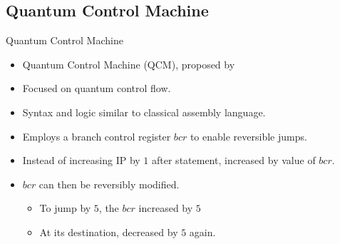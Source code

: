 
\subsection{Quantum Control Machine}
\begin{frame}{Quantum Control Machine}
    \begin{itemize}
        \item Quantum Control Machine (QCM), proposed by \cite{YVC24}
        \item Focused on quantum control flow.
        \item Syntax and logic similar to classical assembly language.
        \item Employs a branch control register $bcr$ to enable reversible jumps.
        \item Instead of increasing IP by $1$ after statement, increased by value of $bcr$.
        \item $bcr$ can then be reversibly modified.
        \begin{itemize}
            \item To jump by $5$, the $bcr$ increased by $5$
            \item At its destination, decreased by $5$ again.
        \end{itemize}
    \end{itemize}
\end{frame}


